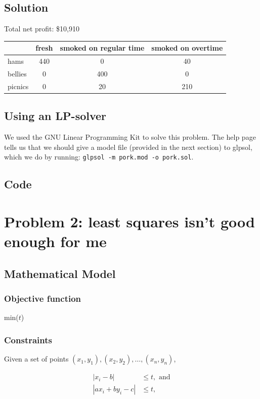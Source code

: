 \documentclass[letterpaper,10pt]{article}
\begin{document}
	\newpage
	\subsection{Solution}
		Total net profit: \$10,910 \\

		\begin{tabular}{|l|ccc|} \hline
			& fresh & smoked on regular time & smoked on overtime \\ \hline
			hams    & 440 & 0   & 40 \\
			bellies & 0   & 400 & 0 \\
			picnics & 0   & 20  & 210 \\ \hline
		\end{tabular}

	\subsection{Using an LP-solver}
		We used the GNU Linear Programming Kit to solve this problem. The help page tells us that we should give a model file (provided in the next section) to glpsol, which we do by running: {\tt glpsol -m pork.mod -o pork.sol}.

	\subsection{Code}
		


	\section{Problem 2: least squares isn’t good enough for me}

	\subsection{Mathematical Model}
		\subsubsection{Objective function}
		min($t$)

		\subsubsection{Constraints}
		Given a set of points $(x_1,y_1), (x_2,y_2), \dots, (x_n,y_n)$,

		\begin{align*}
			|x_i - b| &\le t, \text{ and} \\
			|ax_i + by_i - c| &\le t,
		\end{align*}
\end{document}
